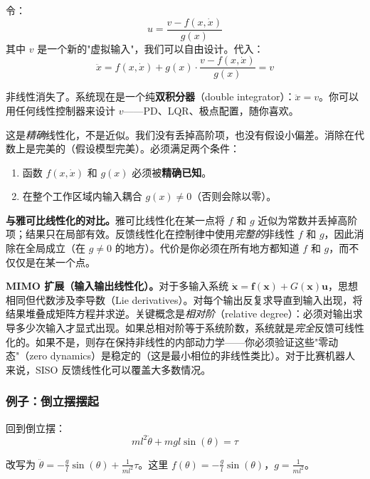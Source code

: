 令：
\begin{equation}
u = \frac{v - f(x, \dot{x})}{g(x)}
\end{equation}
其中 $v$ 是一个新的"虚拟输入"，我们可以自由设计。代入：
\begin{equation}
\ddot{x} = f(x, \dot{x}) + g(x) \cdot \frac{v - f(x, \dot{x})}{g(x)} = v
\end{equation}

非线性消失了。系统现在是一个纯\textbf{双积分器}（double integrator）：$\ddot{x} = v$。你可以用任何线性控制器来设计 $v$——PD、LQR、极点配置，随你喜欢。

这是\textit{精确}线性化，不是近似。我们没有丢掉高阶项，也没有假设小偏差。消除在代数上是完美的（假设模型完美）。必须满足两个条件：
\begin{enumerate}[nosep]
    \item 函数 $f(x, \dot{x})$ 和 $g(x)$ 必须被\textbf{精确已知}。
    \item 在整个工作区域内输入耦合 $g(x) \neq 0$（否则会除以零）。
\end{enumerate}

\textbf{与雅可比线性化的对比。}雅可比线性化在某一点将 $f$ 和 $g$ 近似为常数并丢掉高阶项；结果只在局部有效。反馈线性化在控制律中使用\textit{完整的}非线性 $f$ 和 $g$，因此消除在全局成立（在 $g \neq 0$ 的地方）。代价是你必须在所有地方都知道 $f$ 和 $g$，而不仅仅是在某一个点。

\textbf{MIMO 扩展（输入输出线性化）。}对于多输入系统 $\dot{\mathbf{x}} = \mathbf{f}(\mathbf{x}) + G(\mathbf{x})\mathbf{u}$，思想相同但代数涉及李导数（Lie derivatives）。对每个输出反复求导直到输入出现，将结果堆叠成矩阵方程并求逆。关键概念是\textit{相对阶}（relative degree）：必须对输出求导多少次输入才显式出现。如果总相对阶等于系统阶数，系统就是\textit{完全}反馈可线性化的。如果不是，则存在保持非线性的内部动力学——你必须验证这些"零动态"（zero dynamics）是稳定的（这是最小相位的非线性类比）。对于比赛机器人来说，SISO 反馈线性化可以覆盖大多数情况。

\subsubsection{例子：倒立摆摆起}

回到倒立摆：
\begin{equation}
ml^2 \ddot{\theta} + mgl\sin(\theta) = \tau
\end{equation}

改写为 $\ddot{\theta} = -\frac{g}{l}\sin(\theta) + \frac{1}{ml^2}\tau$。这里 $f(\theta) = -\frac{g}{l}\sin(\theta)$，$g = \frac{1}{ml^2}$。


